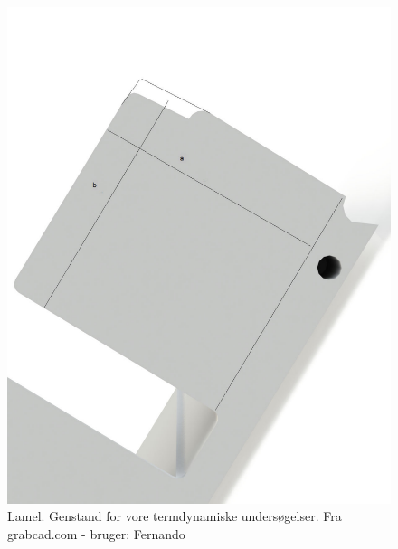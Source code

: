 \begin{figure}
	\centering
	\includegraphics[width=0.7\linewidth]{billeder/lamel}
	\caption{Lamel. Genstand for vore termdynamiske undersøgelser. Fra grabcad.com - bruger: Fernando}
	\label{fig:lamel}
\end{figure}
